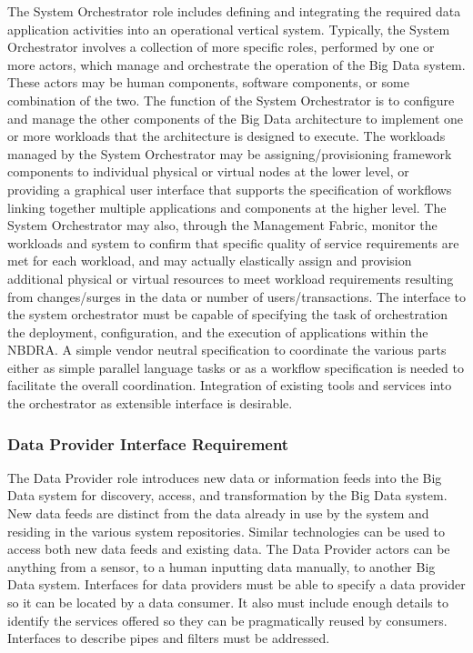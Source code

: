 \documentclass[10pt]{article}
\begin{document}
The System Orchestrator role includes defining and integrating the
required data application activities into an operational vertical
system. Typically, the System Orchestrator involves a collection of
more specific roles, performed by one or more actors, which manage and
orchestrate the operation of the Big Data system. These actors may be
human components, software components, or some combination of the two.
The function of the System Orchestrator is to configure and manage the
other components of the Big Data architecture to implement one or more
workloads that the architecture is designed to execute. The workloads
managed by the System Orchestrator may be assigning/provisioning
framework components to individual physical or virtual nodes at the
lower level, or providing a graphical user interface that supports the
specification of workflows linking together multiple applications and
components at the higher level. The System Orchestrator may also,
through the Management Fabric, monitor the workloads and system to
confirm that specific quality of service requirements are met for each
workload, and may actually elastically assign and provision additional
physical or virtual resources to meet workload requirements resulting
from changes/surges in the data or number of users/transactions. The
interface to the system orchestrator must be capable of specifying the
task of orchestration the deployment, configuration, and the execution
of applications within the NBDRA. A simple vendor neutral
specification to coordinate the various parts either as simple
parallel language tasks or as a workflow specification is needed to
facilitate the overall coordination. Integration of existing tools and
services into the orchestrator as extensible interface is desirable.

\subsubsection{Data Provider Interface Requirement}\label{S:r-provider}

The Data Provider role introduces new data or information feeds into
the Big Data system for discovery, access, and transformation by the
Big Data system. New data feeds are distinct from the data already in
use by the system and residing in the various system repositories.
Similar technologies can be used to access both new data feeds and
existing data. The Data Provider actors can be anything from a sensor,
to a human inputting data manually, to another Big Data system.
Interfaces for data providers must be able to specify a data provider
so it can be located by a data consumer. It also must include enough
details to identify the services offered so they can be pragmatically
reused by consumers. Interfaces to describe pipes and filters must be
addressed.
\end{document}
